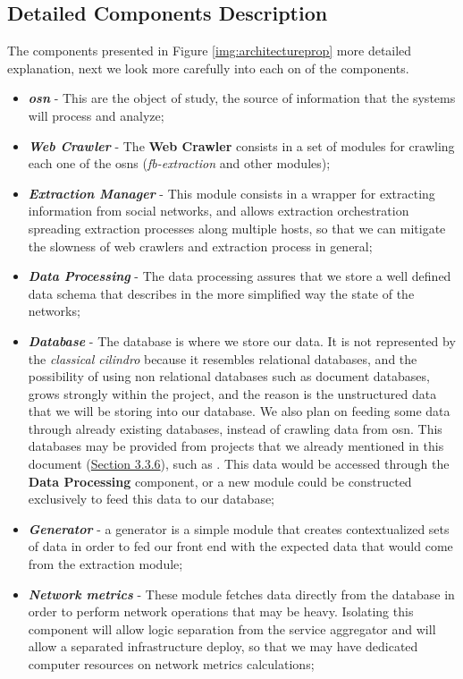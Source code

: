 \subsection{Detailed Components Description}
The components presented in Figure \ref{img:architectureprop} more detailed explanation, next we look more carefully into each on of the components.
\begin{itemize}
    \item \textbf{\textit{\acrfull{osn}}} - This are the object of study, the source of information that the systems will process and analyze;
    \item \textbf{\textit{Web Crawler}} - The \textbf{Web Crawler} consists in a set of modules for crawling each one of the \glspl{osn} (\textit{fb-extraction} and other modules);
    \item \textbf{\textit{Extraction Manager}} - This module consists in a wrapper for extracting information from social networks, and allows extraction orchestration spreading extraction processes along multiple hosts, so that we can mitigate the slowness of web crawlers and extraction process in general;
    \item \textbf{\textit{Data Processing}} - The data processing assures that we store a well defined data schema that describes in the more simplified way the state of the networks;
    \item \textbf{\textit{Database}} - The database is where we store our data. It is not represented by the \textit{classical cilindro} because it resembles relational databases, and the possibility of using non relational databases such as document databases, grows strongly within the project, and the reason is the unstructured data that we will be storing into our database. We also plan on feeding some data through already existing databases, instead of crawling data from \gls{osn}. This databases may be provided from projects that we already mentioned in this document  (\hyperref[sec:otherdatasources]{Section 3.3.6}), such as \citep{kunegis2013konect}. This data would be accessed through the \textbf{Data Processing} component, or a new module could be constructed exclusively to feed this data to our database;
    \item \textbf{\textit{Generator}} - a generator is a simple module that creates contextualized sets of data in order to fed our front end with the expected data that would come from the extraction module;
    \item \textbf{\textit{Network metrics}} - These module fetches data directly from the database in order to perform network operations that may be heavy. Isolating this component will allow logic separation from the service aggregator and will allow a separated infrastructure deploy, so that we may have dedicated computer resources on network metrics calculations;

\end{itemize}
